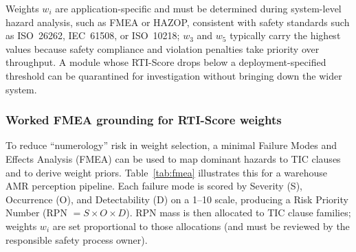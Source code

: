 \documentclass[smallextended]{svjour3}
\begin{document}
\FloatBarrier

Weights $w_i$ are application-specific and must be determined
during system-level hazard analysis, such as FMEA or HAZOP,
consistent with safety standards such as ISO~26262,
IEC~61508, or ISO~10218; $w_3$ and $w_5$ typically carry the highest values
because safety compliance and violation penalties take priority
over throughput. A module whose RTI-Score drops below a
deployment-specified threshold can be quarantined for
investigation without bringing down the wider system.

\subsubsection{Worked FMEA grounding for RTI-Score weights}
\label{subsec:fmea_weights}
To reduce ``numerology'' risk in weight selection, a minimal Failure Modes and Effects
Analysis (FMEA) can be used to map dominant hazards to TIC clauses and to derive weight
priors. Table~\ref{tab:fmea} illustrates this for a warehouse AMR perception pipeline.
Each failure mode is scored by Severity (S), Occurrence (O), and Detectability (D) on a
1--10 scale, producing a Risk Priority Number (RPN \(=S\times O\times D\)). RPN mass is
then allocated to TIC clause families; weights \(w_i\) are set proportional to those
allocations (and must be reviewed by the responsible safety process owner).
\end{document}
